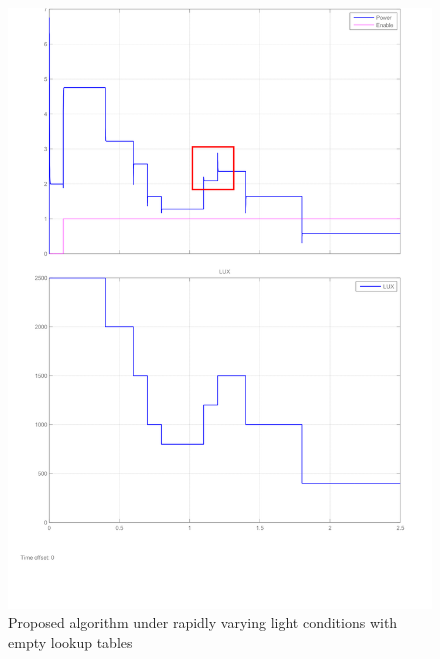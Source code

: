                     
 \begin{figure}[H]
  \begin{center}
  \includegraphics[width=\textwidth]{images/proposed_step_input}
  \caption{Proposed algorithm under rapidly varying light conditions with empty lookup tables }
  \label{fig:proposed_empty_lookup}
  \end{center}
  \end{figure}



